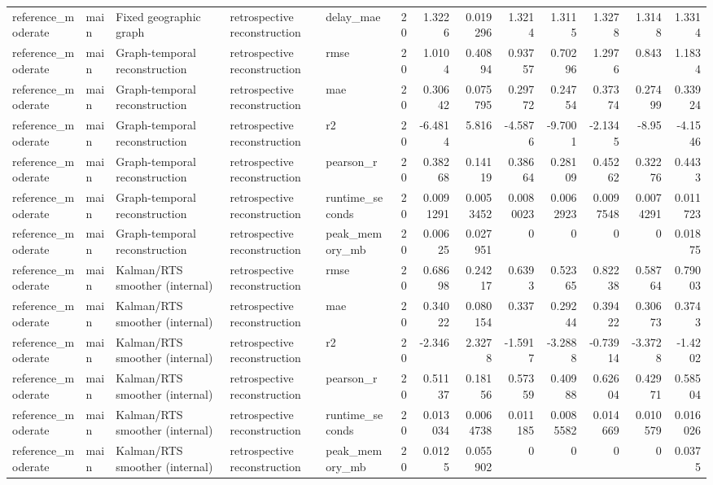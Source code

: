 \begin{table}[!htbp]
{{\begin{tabular}{lllllrrrrrrrr}
reference_moderate & main & Fixed geographic graph & retrospective reconstruction & delay_mae & 20 & 1.3226 & 0.019296 & 1.3214 & 1.3115 & 1.3278 & 1.3148 & 1.3314 \\
reference_moderate & main & Graph-temporal reconstruction & retrospective reconstruction & rmse & 20 & 1.0104 & 0.40894 & 0.93757 & 0.70296 & 1.2976 & 0.843 & 1.1834 \\
reference_moderate & main & Graph-temporal reconstruction & retrospective reconstruction & mae & 20 & 0.30642 & 0.075795 & 0.29772 & 0.24754 & 0.37374 & 0.27499 & 0.33924 \\
reference_moderate & main & Graph-temporal reconstruction & retrospective reconstruction & r2 & 20 & -6.4814 & 5.816 & -4.5876 & -9.7001 & -2.1345 & -8.95 & -4.1546 \\
reference_moderate & main & Graph-temporal reconstruction & retrospective reconstruction & pearson_r & 20 & 0.38268 & 0.14119 & 0.38664 & 0.28109 & 0.45262 & 0.32276 & 0.4433 \\
reference_moderate & main & Graph-temporal reconstruction & retrospective reconstruction & runtime_seconds & 20 & 0.0091291 & 0.0053452 & 0.0080023 & 0.0062923 & 0.0097548 & 0.0074291 & 0.011723 \\
reference_moderate & main & Graph-temporal reconstruction & retrospective reconstruction & peak_memory_mb & 20 & 0.00625 & 0.027951 & 0 & 0 & 0 & 0 & 0.01875 \\
reference_moderate & main & Kalman/RTS smoother (internal) & retrospective reconstruction & rmse & 20 & 0.68698 & 0.24217 & 0.6393 & 0.52365 & 0.82238 & 0.58764 & 0.79003 \\
reference_moderate & main & Kalman/RTS smoother (internal) & retrospective reconstruction & mae & 20 & 0.34022 & 0.080154 & 0.337 & 0.29244 & 0.39422 & 0.30673 & 0.3743 \\
reference_moderate & main & Kalman/RTS smoother (internal) & retrospective reconstruction & r2 & 20 & -2.346 & 2.3278 & -1.5917 & -3.2888 & -0.73914 & -3.3728 & -1.4202 \\
reference_moderate & main & Kalman/RTS smoother (internal) & retrospective reconstruction & pearson_r & 20 & 0.51137 & 0.18156 & 0.57359 & 0.40988 & 0.62604 & 0.42971 & 0.58504 \\
reference_moderate & main & Kalman/RTS smoother (internal) & retrospective reconstruction & runtime_seconds & 20 & 0.013034 & 0.0064738 & 0.011185 & 0.0085582 & 0.014669 & 0.010579 & 0.016026 \\
reference_moderate & main & Kalman/RTS smoother (internal) & retrospective reconstruction & peak_memory_mb & 20 & 0.0125 & 0.055902 & 0 & 0 & 0 & 0 & 0.0375 \\

\end{tabular}}}
\end{table}
